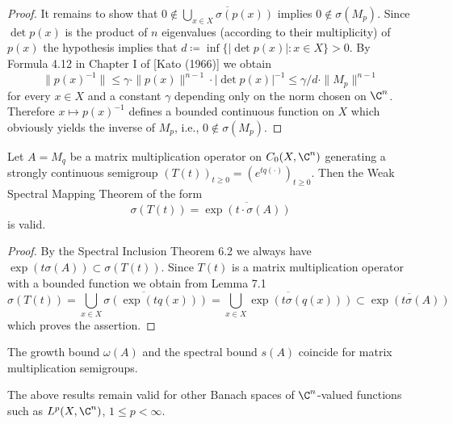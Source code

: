 \begin{proof}
It remains to show that $0 \notin \overline{\bigcup_{x\in X} \sigma(p(x))}$ implies $0 \notin \sigma(M_{p})$.
Since $\det p(x)$ is the product of $n$ eigenvalues (according to their multiplicity) of $p(x)$ the hypothesis implies that $d \coloneqq \inf\{|\det p(x)| \colon x \in X\} > 0$.
By Formula 4.12 in Chapter I of [Kato (1966)] we obtain
\[
\|p(x)^{-1}\| \leq \gamma \cdot \|p(x)\|^{n-1} \cdot |\det p(x)|^{-1} \leq \gamma/d \cdot \|M_{p}\|^{n-1}
\]
for every $x \in X$ and a constant $\gamma$ depending only on the norm chosen on $\C^{n}$.
Therefore $x \mapsto p(x)^{-1}$ defines a bounded continuous function on $X$ which obviously yields the inverse of $M_{p}$, i.e., $0 \notin \sigma(M_{p})$.
\end{proof}

\begin{theorem}\label{thm:a3-7.2}
Let $A = M_{q}$ be a matrix multiplication operator on $C_{0}(X,\C^{n})$ generating a strongly continuous semigroup $(T(t))_{t\geq 0} = (e^{tq(\cdot)})_{t\geq 0}$.
Then the Weak Spectral Mapping Theorem of the form
\begin{equation}\label{eq:a3-7.2}
\sigma(T(t)) = \overline{\exp(t\cdot\sigma(A))}
\end{equation}
is valid.
\end{theorem}

\begin{proof}
By the Spectral Inclusion Theorem 6.2 we always have $\exp(t\sigma(A)) \subset \sigma(T(t))$.
Since $T(t)$ is a matrix multiplication operator with a bounded function we obtain from Lemma 7.1
\[
\sigma(T(t)) = \overline{\bigcup_{x\in X} \sigma(\exp(tq(x)))} = \overline{\bigcup_{x\in X} \exp(t\sigma(q(x)))} \subset \overline{\exp(t\sigma(A))}
\]
which proves the assertion.
\end{proof}

\begin{corollary}\label{cor:a3-7.3}
The growth bound $\omega(A)$ and the spectral bound $s(A)$ coincide for matrix multiplication semigroups.
\end{corollary}

\begin{remark}
The above results remain valid for other Banach spaces of $\C^{n}$-valued functions such as $L^{p}(X,\C^{n})$, $1 \leq p < \infty$.
\end{remark}


